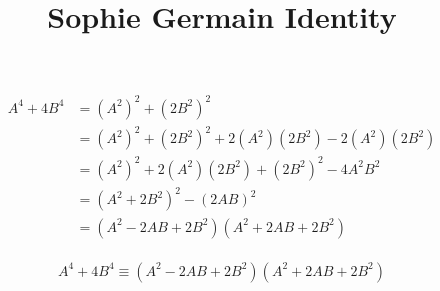 \documentclass[landscape]{memoir}
\title{\HUGE Sophie Germain Identity}
\author{}
\date{}
\begin{document}
\maketitle
\thispagestyle{empty}

\begin{Huge}
\[\begin{aligned}
	A^4+4B^4&=\left(A^2\right)^2+\left(2B^2\right)^2\\
		&=\left(A^2\right)^2+\left(2B^2\right)^2+2\left(A^2\right)\left(2B^2\right)-2\left(A^2\right)\left(2B^2\right)\\
		&=\left(A^2\right)^2+2\left(A^2\right)\left(2B^2\right)+\left(2B^2\right)^2-4A^2B^2\\
		&=\left(A^2+2B^2\right)^2-(2AB)^2\\
		&=\left(A^2-2AB+2B^2\right)\left(A^2+2AB+2B^2\right)\\
\end{aligned}\]

\[\boxed{A^4+4B^4\equiv\left(A^2-2AB+2B^2\right)\left(A^2+2AB+2B^2\right)}\]

\end{Huge}
\end{document}
